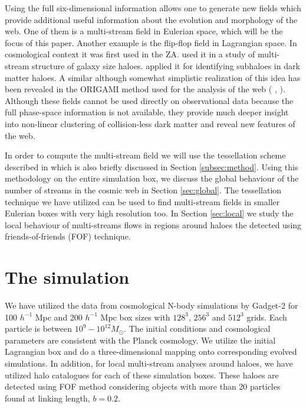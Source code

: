 Using the full six-dimensional information allows one to generate new fields which  provide 
additional useful information about the evolution and morphology of the  web. 
One of them is a multi-stream field in Eulerian space, which will be the focus of this paper. 
Another example is the flip-flop field in Lagrangian space. In cosmological context it was first used in the ZA.
\citet{Vogelsberger2011} used it in a study of multi-stream structure of galaxy size haloes.
\citet{Shandarin2014a} applied it for identifying subhaloes  in dark matter haloes.
A similar although somewhat simplistic realization of this idea has been revealed in the ORIGAMI method
used for the analysis of the web ( \citealt{Falck2012},  \citealt{Falck2015} ).
 Although these fields cannot be used directly on observational data because the full phase-space information
 is not available, they provide much deeper insight into non-linear clustering of collision-less dark matter
and reveal new features of the web.


In order to compute the multi-stream field we will use the tessellation scheme described in
 \citet{Shandarin2012} which is  also briefly discussed in Section \ref{subsec:method}.
  Using this methodology on the entire simulation box, we discuss the global behaviour of the number of streams in the cosmic web in Section \ref{sec:global}. 
  The tessellation technique we have utilized can be used to find multi-stream fields in smaller Eulerian boxes with very high resolution too. In Section \ref{sec:local} we study the local behaviour of multi-streams flows in regions around haloes the detected using friends-of-friends (FOF) technique.
 
 


\section{The simulation}
\label{sec:simulation}


We have utilized the data from cosmological N-body simulations by Gadget-2 \citep{Springel2005c} for 100 $h^{-1}$ Mpc  and 200 $h^{-1}$ Mpc box 
sizes with $128^3$, $256^3$ and $512^3$ grids. Each particle is between  $10^9 - 10^{12} M_{\odot}$. 
The initial conditions and cosmological parameters are consistent with the Planck cosmology. We utilize the initial Lagrangian box and do a three-dimensional mapping onto corresponding evolved simulations. In addition, for local multi-stream analyses around haloes, we have utilized halo catalogues for each of these simulation boxes. These haloes are detected using FOF method considering objects with more than 20 particles found at linking length, $ b= 0.2$.  
